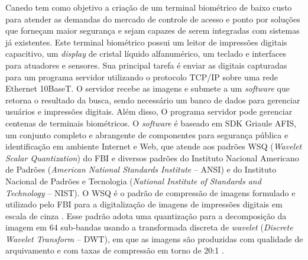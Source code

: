  
 
 Canedo \cite{canedo2003terminal} tem como objetivo a criação de um terminal biométrico de baixo custo para atender as demandas do mercado de controle de acesso e ponto por soluções que forneçam maior segurança e sejam capazes de serem integradas com sistemas já existentes. Este terminal biométrico possui um leitor de impressões digitais capacitivo, um \textit{display} de cristal líquido alfanumérico, um teclado e interfaces para atuadores e sensores. Sua principal tarefa  é enviar as digitais capturadas para um programa servidor utilizando o protocolo TCP/IP sobre uma rede Ethernet 10BaseT. O servidor recebe as imagens e submete a um \textit{software} que retorna o resultado da busca, sendo necessário um banco de dados para gerenciar usuários e impressões digitais. Além disso, O programa servidor pode gerenciar centenas de terminais biométricos. 
 O \textit{software} é baseado em SDK Griaule AFIS, um conjunto completo e abrangente de componentes para segurança pública e identificação em ambiente Internet e Web, que atende aos padrões WSQ (\textit{Wavelet Scalar Quantization}) do FBI e diversos padrões do Instituto Nacional Americano de Padrões (\textit{American National Standards Institute} -- ANSI) e do  Instituto Nacional de Padrões e Tecnologia (\textit{National Institute of Standards and Technology} -- NIST). O WSQ é o padrão de compressão de imagens formulado e utilizado pelo FBI para a digitalização de imagens de impressões digitais em escala de cinza \cite{ de2007analise}. Esse padrão adota uma quantização para a decomposição da imagem em 64 sub-bandas usando a transformada discreta de \textit{wavelet} (\textit{Discrete Wavelet Transform} -- DWT), em que as imagens são produzidas com qualidade de arquivamento e com taxas de compressão em torno de 20:1 \cite{brislawn1996fbi}.
 
 
 


